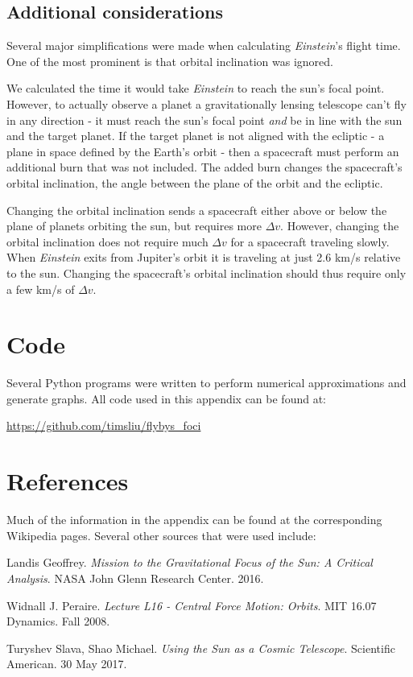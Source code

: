 \documentclass[12pt]{article} %
\begin{document}
\subsection{Additional considerations}
Several major simplifications were made when calculating \textit{Einstein}'s flight time. One of the most prominent is that orbital inclination was ignored.

We calculated the time it would take \textit{Einstein} to reach the sun's focal point. However, to actually observe a planet a gravitationally lensing telescope can't fly in any direction - it must reach the sun's focal point \textit{and} be in line with the sun and the target planet. If the target planet is not aligned with the ecliptic - a plane in space defined by the Earth's orbit - then a spacecraft must perform an additional burn that was not included. The added burn changes the spacecraft's orbital inclination, the angle between the plane of the orbit and the ecliptic. 

Changing the orbital inclination sends a spacecraft either above or below the plane of planets orbiting the sun, but requires more $\Delta v$. However, changing the orbital inclination does not require much $\Delta v$ for a spacecraft traveling slowly. When \textit{Einstein} exits from Jupiter's orbit it is traveling at just 2.6 km/s relative to the sun. Changing the spacecraft's orbital inclination should thus require only a few km/s of $\Delta v$.

\section{Code}
Several Python programs were written to perform numerical approximations and generate graphs. All code used in this appendix can be found at:

\url{https://github.com/timsliu/flybys_foci}

\section{References}

Much of the information in the appendix can be found at the corresponding Wikipedia pages. Several other sources that were used include:

Landis Geoffrey. \textit{Mission to the Gravitational Focus of the Sun: A Critical Analysis}. NASA John Glenn Research Center. 2016.

Widnall J. Peraire. \textit{Lecture L16 - Central Force Motion: Orbits}. MIT 16.07 Dynamics. Fall 2008.

Turyshev Slava, Shao Michael. \textit{Using the Sun as a Cosmic Telescope}. Scientific American. 30 May 2017.
\end{document}
